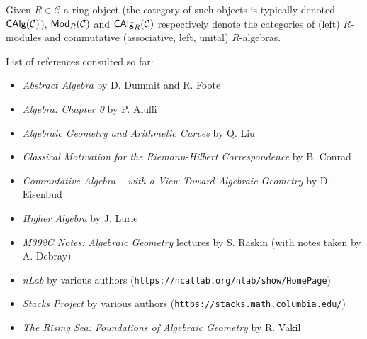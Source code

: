 \documentclass[11pt]{article}
\newcommand{\CC}{\mathcal{C}}
\begin{document}
Given $R\in\CC$ a ring object (the category of such objects is typically denoted $\CAlg(\CC)$), $\Mod_R(\CC)$ and $\CAlg_R(\CC)$ respectively denote the categories of (left) $R$-modules and commutative (associative, left, unital) $R$-algebras.

List of references consulted so far:
\begin{itemize}
\item \emph{Abstract Algebra} by D. Dummit and R. Foote
\item \emph{Algebra: Chapter 0} by P. Aluffi
\item \emph{Algebraic Geometry and Arithmetic Curves} by Q. Liu
\item \emph{Classical Motivation for the Riemann-Hilbert Correspondence} by B. Conrad
\item \emph{Commutative Algebra -- with a View Toward Algebraic Geometry} by D. Eisenbud
\item \emph{Higher Algebra} by J. Lurie
\item \emph{M392C Notes: Algebraic Geometry} lectures by S. Raskin (with notes taken by A. Debray)
\item \emph{nLab} by various authors (\texttt{https://ncatlab.org/nlab/show/HomePage})
\item \emph{Stacks Project} by various authors (\texttt{https://stacks.math.columbia.edu/})
\item \emph{The Rising Sea: Foundations of Algebraic Geometry} by R. Vakil
\end{itemize}
\end{document}
